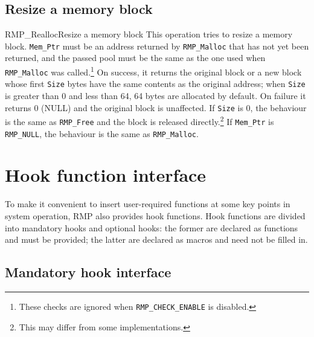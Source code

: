 \subsection{Resize a memory block}
\begin{apidesc}{RMP\_Realloc}{Resize a memory block}\label{api:RMP_Realloc}
    This operation tries to resize a memory block.
    \texttt{Mem\_Ptr} must be an
    address returned by \texttt{RMP\_Malloc} that has not yet been returned, and the
    passed pool must be the same as the one used when \texttt{RMP\_Malloc} was
    called.\footnote{These checks are ignored when \texttt{RMP\_CHECK\_ENABLE} is disabled.}
    On success, it returns the original block or a new block whose first \texttt{Size} bytes have the same contents as the original address; when \texttt{Size} is greater than 0 and less than 64, 64 bytes are allocated by default.
    On failure it returns 0 (NULL) and the original block is unaffected.
    If \texttt{Size} is 0, the behaviour is the same as \texttt{RMP\_Free} and the block is released directly.\footnote{This may differ from some implementations.}
    If \texttt{Mem\_Ptr} is \texttt{RMP\_NULL}, the behaviour is the same as \texttt{RMP\_Malloc}.
    \begin{apiparams}
    \end{apiparams}
    \begin{apiret}
    \end{apiret}
\end{apidesc}

\section{Hook function interface}

To make it convenient to insert user-required functions at some key points in system operation, RMP also provides hook functions.
Hook functions are divided into mandatory hooks and optional hooks: the former are declared as functions and must be provided; the latter are declared as macros and need not be filled in.

\subsection{Mandatory hook interface}

